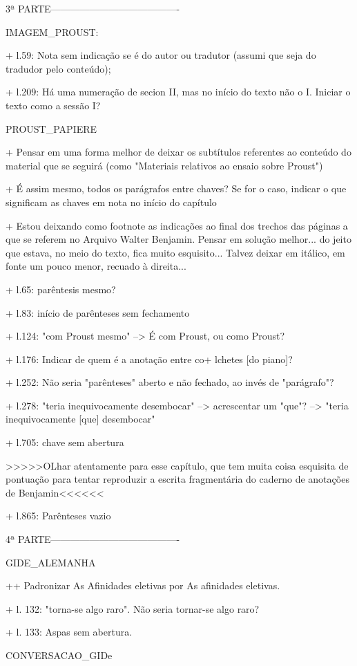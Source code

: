 3ª PARTE----------------------------------------

IMAGEM_PROUST:

+ l.59: Nota sem indicação se é do autor ou tradutor (assumi que seja do tradudor pelo conteúdo);

+ l.209: Há uma numeração de secion II, mas no início do texto não o I. Iniciar o texto como a sessão I?

PROUST_PAPIERE

+ Pensar em uma forma melhor de deixar os subtítulos referentes ao conteúdo do material que se seguirá (como "Materiais relativos ao ensaio sobre Proust")

+ É assim mesmo, todos os parágrafos entre chaves? Se for o caso, indicar o que significam as chaves em nota no início do capítulo

+ Estou deixando como footnote as indicações ao final dos trechos das páginas a que se referem no Arquivo Walter Benjamin. Pensar em solução melhor... do jeito que estava, no meio do texto, fica muito esquisito... Talvez deixar em itálico, em fonte um pouco menor, recuado à direita...

+ l.65: parêntesis mesmo?

+ l.83: início de parênteses sem fechamento

+ l.124: "com Proust mesmo" --> É com Proust, ou como Proust?

+ l.176: Indicar de quem é a anotação entre co+ lchetes [do piano]?

+ l.252: Não seria "parênteses" aberto e não fechado, ao invés de "parágrafo"?

+ l.278: "teria inequivocamente desembocar" --> acrescentar um "que"? --> "teria inequivocamente [que] desembocar"

+ l.705: chave sem abertura

>>>>>OLhar atentamente para esse capítulo, que tem muita coisa esquisita de pontuação para tentar reproduzir a escrita fragmentária do caderno de anotações de Benjamin<<<<<<

+ l.865: Parênteses vazio

4ª PARTE----------------------------------------

GIDE_ALEMANHA

++ Padronizar As Afinidades eletivas por As afinidades eletivas.

+ l. 132: "torna-se algo raro". Não seria tornar-se algo raro?

+ l. 133: Aspas sem abertura.

CONVERSACAO_GIDe

